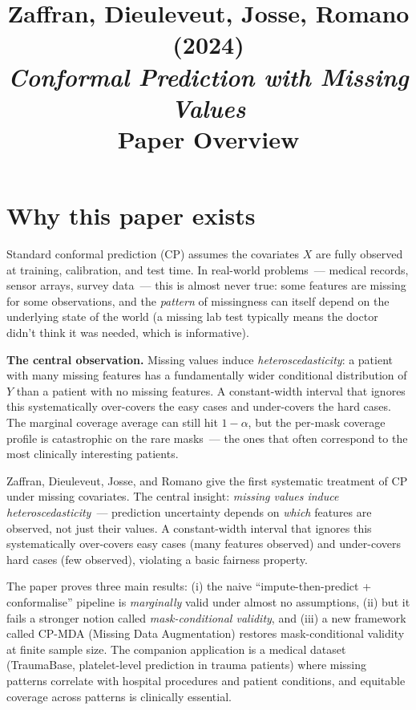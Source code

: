 \documentclass[letterpaper,11pt,leqno]{article}
\title{Zaffran, Dieuleveut, Josse, Romano (2024)\\\textit{Conformal Prediction with Missing Values}\\[2pt]\large Paper Overview}
\author{}
\date{}
\begin{document}
\maketitle

\section{Why this paper exists}\label{s:intro}

Standard conformal prediction (CP) assumes the covariates $X$ are fully observed at training, calibration, and test time. In real-world problems~--- medical records, sensor arrays, survey data~--- this is almost never true: some features are missing for some observations, and the \emph{pattern} of missingness can itself depend on the underlying state of the world (a missing lab test typically means the doctor didn't think it was needed, which is informative).

\begin{keyinsight}
\textbf{The central observation.} Missing values induce \emph{heteroscedasticity}: a patient with many missing features has a fundamentally wider conditional distribution of $Y$ than a patient with no missing features. A constant-width interval that ignores this systematically over-covers the easy cases and under-covers the hard cases. The marginal coverage average can still hit $1-\alpha$, but the per-mask coverage profile is catastrophic on the rare masks~--- the ones that often correspond to the most clinically interesting patients.
\end{keyinsight}

Zaffran, Dieuleveut, Josse, and Romano \cite{zaffran2024missing} give the first systematic treatment of CP under missing covariates. The central insight: \emph{missing values induce heteroscedasticity}~--- prediction uncertainty depends on \emph{which} features are observed, not just their values. A constant-width interval that ignores this systematically over-covers easy cases (many features observed) and under-covers hard cases (few observed), violating a basic fairness property.

The paper proves three main results: (i) the naive ``impute-then-predict + conformalise'' pipeline is \emph{marginally} valid under almost no assumptions, (ii) but it fails a stronger notion called \emph{mask-conditional validity}, and (iii) a new framework called CP-MDA (Missing Data Augmentation) restores mask-conditional validity at finite sample size. The companion application is a medical dataset (TraumaBase, platelet-level prediction in trauma patients) where missing patterns correlate with hospital procedures and patient conditions, and equitable coverage across patterns is clinically essential.
\end{document}
